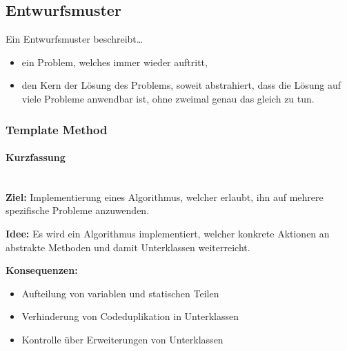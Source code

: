 \documentclass[ngerman]{tuda_summary}
\begin{document}
\subsection{Entwurfsmuster}
Ein Entwurfsmuster beschreibt\dots
\begin{itemize}
    \item ein Problem, welches immer wieder auftritt,
    \item den Kern der Lösung des Problems, soweit abstrahiert, dass die Lösung auf viele Probleme anwendbar ist, ohne zweimal genau das gleich zu tun.
\end{itemize}

\subsubsection{Template Method}
\paragraph{Kurzfassung}\mbox{}\\
\textbf{Ziel:} Implementierung eines Algorithmus, welcher erlaubt, ihn auf mehrere spezifische Probleme anzuwenden.

\textbf{Idee:} Es wird ein Algorithmus implementiert, welcher konkrete Aktionen an abstrakte Methoden und damit Unterklassen weiterreicht.

\textbf{Konsequenzen:}
\begin{itemize}
    \item Aufteilung von variablen und statischen Teilen
    \item Verhinderung von Codeduplikation in Unterklassen
    \item Kontrolle über Erweiterungen von Unterklassen
\end{itemize}
\end{document}
